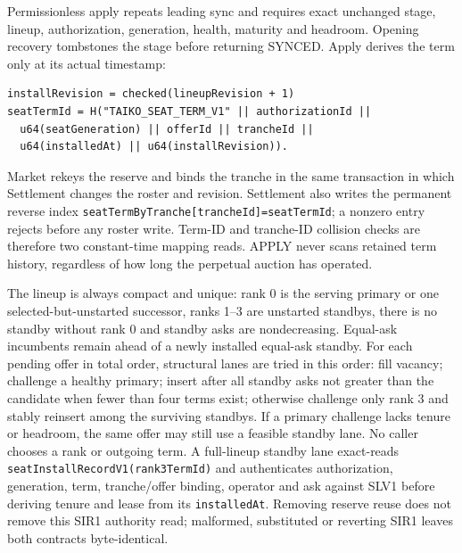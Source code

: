 \documentclass[a4paper,11pt]{article}
\newcommand{\code}[1]{\nolinkurl{#1}}
\begin{document}
Permissionless apply repeats leading sync and requires exact unchanged stage,
lineup, authorization, generation, health, maturity and headroom.  Opening
recovery tombstones the stage before returning SYNCED.  Apply derives the term
only at its actual timestamp:
\begin{verbatim}
installRevision = checked(lineupRevision + 1)
seatTermId = H("TAIKO_SEAT_TERM_V1" || authorizationId ||
  u64(seatGeneration) || offerId || trancheId ||
  u64(installedAt) || u64(installRevision)).
\end{verbatim}
Market rekeys the reserve and binds the tranche in the same transaction in which
Settlement changes the roster and revision.  Settlement also writes the
permanent reverse index \code{seatTermByTranche[trancheId]=seatTermId}; a nonzero
entry rejects before any roster write.  Term-ID and tranche-ID collision checks
are therefore two constant-time mapping reads.  APPLY never scans retained term
history, regardless of how long the perpetual auction has operated.

The lineup is always compact and unique: rank 0 is the serving primary or one
selected-but-unstarted successor, ranks 1--3 are unstarted standbys, there is no
standby without rank 0 and standby asks are nondecreasing.  Equal-ask incumbents
remain ahead of a newly installed equal-ask standby.  For each pending offer in
total order, structural lanes are tried in this order: fill vacancy; challenge
a healthy primary; insert after all standby asks not greater than the candidate
when fewer than four terms exist; otherwise challenge only rank 3 and stably
reinsert among the surviving standbys.  If a primary challenge lacks tenure or
headroom, the same offer may still use a feasible standby lane.  No caller
chooses a rank or outgoing term.  A full-lineup standby lane exact-reads
\code{seatInstallRecordV1(rank3TermId)} and authenticates authorization,
generation, term, tranche/offer binding, operator and ask against SLV1 before
deriving tenure and lease from its \code{installedAt}.  Removing reserve reuse
does not remove this SIR1 authority read; malformed, substituted or reverting
SIR1 leaves both contracts byte-identical.
\end{document}
